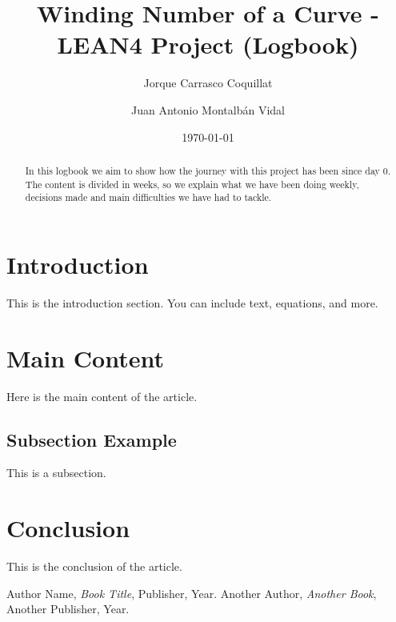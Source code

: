 \documentclass[a4paper,12pt]{article}
\title{Winding Number of a Curve - LEAN4 Project (Logbook)}
\author{Jorque Carrasco Coquillat \and
Juan Antonio Montalbán Vidal}
\date{\today} %
\begin{document}
\maketitle

\begin{abstract}
In this logbook we aim to show how the journey with this project has been since day 0.
The content is divided in weeks, so we explain what we have been doing weekly,
decisions made and main difficulties we have had to tackle.
\end{abstract}

\section{Introduction}
This is the introduction section. You can include text, equations, and more.

\section{Main Content}
Here is the main content of the article.

\subsection{Subsection Example}
This is a subsection.

\section{Conclusion}
This is the conclusion of the article.

\begin{thebibliography}{9}
 Author Name, \textit{Book Title}, Publisher, Year.
 Another Author, \textit{Another Book}, Another Publisher, Year.
\end{thebibliography}
\end{document}
